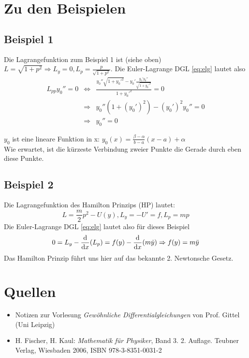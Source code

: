 \section{Zu den Beispielen}

\subsection*{Beispiel 1}
Die Lagrangefunktion zum Beispiel 1 ist (siehe oben) $L = \sqrt{1 + p^2} \Rightarrow L_y = 0, L_p = \frac{p}{\sqrt{1+p^2}}$.
Die Euler-Lagrange DGL \eqref{eq:elg} lautet also
\begin{eqnarray*}
    L_{pp} y_0'' = 0 &\Leftrightarrow& \frac{y_0''\sqrt{1+y_0'^2} - y_0' \frac{y_0' y_0''}{\sqrt{1+y_0'^2}}}{1+y_0'^2} = 0 \\
        &\Rightarrow& y_0'' (1+(y_0')^2) - (y_0')^2 y_0'' = 0 \\
        &\Rightarrow& y_0'' = 0
\end{eqnarray*}

$y_0$ ist eine lineare Funktion in x: $y_0(x) = \frac{\beta - \alpha}{b - a} (x - a) + \alpha$ \\
Wie erwartet, ist die kürzeste Verbindung zweier Punkte die Gerade durch eben diese Punkte.

\subsection*{Beispiel 2}
Die Lagrangefunktion des Hamilton Prinzips (HP) lautet:
\[ L = \frac{m}{2}p^2 - U(y), L_y = -U' = f, L_p = mp \]
Die Euler-Lagrange DGL \eqref{eq:elg} lautet also für dieses Beispiel
\[ 0 = L_y - \frac{\mathrm{d} }{\mathrm{d} x}(L_p) = f(y)-\frac{\mathrm{d} }{\mathrm{d} x}(m\dot{y}) \Rightarrow f(y) = m\ddot{y} \]
Das Hamilton Prinzip führt uns hier auf das bekannte 2. Newtonsche Gesetz.

\section*{Quellen}
\begin{itemize}
    \item Notizen zur Vorlesung \textit{Gewöhnliche Differentialgleichungen} von Prof. Gittel (Uni Leipzig)
    \item H. Fischer, H. Kaul: \textit{Mathematik für Physiker}, Band 3. 2. Auflage. Teubner Verlag, Wiesbaden 2006, ISBN 978-3-8351-0031-2
\end{itemize}


